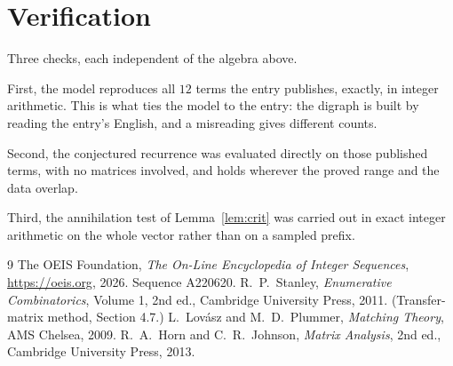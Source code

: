 \documentclass[11pt,a4paper]{article}
\theoremstyle{plain}
\theoremstyle{definition}
\begin{document}
\section{Verification}

Three checks, each independent of the algebra above.

First, the model reproduces all $12$ terms the entry publishes, exactly, in integer
arithmetic. This is what ties the model to the entry: the digraph is built by reading the
entry's English, and a misreading gives different counts.

Second, the conjectured recurrence was evaluated directly on those published terms, with no
matrices involved, and holds wherever the proved range and the data overlap.

Third, the annihilation test of Lemma~\ref{lem:crit} was carried out in exact integer
arithmetic on the whole vector rather than on a sampled prefix.

\begin{thebibliography}{9}
 The OEIS Foundation, \emph{The On-Line Encyclopedia of Integer
Sequences}, \url{https://oeis.org}, 2026. Sequence A220620.
 R.~P.~Stanley, \emph{Enumerative Combinatorics}, Volume 1, 2nd ed.,
Cambridge University Press, 2011. (Transfer-matrix method, Section 4.7.)
 L.~Lov\'asz and M.~D.~Plummer, \emph{Matching Theory}, AMS Chelsea,
2009.
 R.~A.~Horn and C.~R.~Johnson, \emph{Matrix Analysis}, 2nd ed., Cambridge
University Press, 2013.
\end{thebibliography}
\end{document}
